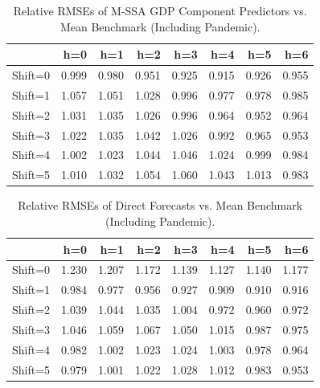 \documentclass[11pt,a4paper]{article}
\begin{document}
\begin{table}[ht]
\caption{Relative RMSEs of M-SSA GDP Component Predictors vs. Mean Benchmark (Including Pandemic).
\label{tab:rRMSE_mSSA_comp_mean2}}
\centering
\begin{tabular}{rrrrrrrr}
  \hline
 & h=0 & h=1 & h=2 & h=3 & h=4 & h=5 & h=6 \\ 
  \hline
Shift=0 & 0.999 & 0.980 & 0.951 & 0.925 & 0.915 & 0.926 & 0.955 \\ 
  Shift=1 & 1.057 & 1.051 & 1.028 & 0.996 & 0.977 & 0.978 & 0.985 \\ 
  Shift=2 & 1.031 & 1.035 & 1.026 & 0.996 & 0.964 & 0.952 & 0.964 \\ 
  Shift=3 & 1.022 & 1.035 & 1.042 & 1.026 & 0.992 & 0.965 & 0.953 \\ 
  Shift=4 & 1.002 & 1.023 & 1.044 & 1.046 & 1.024 & 0.999 & 0.984 \\ 
  Shift=5 & 1.010 & 1.032 & 1.054 & 1.060 & 1.043 & 1.013 & 0.983 \\  
   \hline
\end{tabular}
\end{table}

\begin{table}[htpb]
\caption{Relative RMSEs of Direct Forecasts vs. Mean Benchmark (Including Pandemic).
\label{tab:rRMSE_mSSA_comp_direct3}}
\centering
\begin{tabular}{rrrrrrrr}
  \hline
 & h=0 & h=1 & h=2 & h=3 & h=4 & h=5 & h=6 \\ 
  \hline
Shift=0 & 1.230 & 1.207 & 1.172 & 1.139 & 1.127 & 1.140 & 1.177 \\ 
  Shift=1 & 0.984 & 0.977 & 0.956 & 0.927 & 0.909 & 0.910 & 0.916 \\ 
  Shift=2 & 1.039 & 1.044 & 1.035 & 1.004 & 0.972 & 0.960 & 0.972 \\ 
  Shift=3 & 1.046 & 1.059 & 1.067 & 1.050 & 1.015 & 0.987 & 0.975 \\ 
  Shift=4 & 0.982 & 1.002 & 1.023 & 1.024 & 1.003 & 0.978 & 0.964 \\ 
  Shift=5 & 0.979 & 1.001 & 1.022 & 1.028 & 1.012 & 0.983 & 0.953 \\   
   \hline
\end{tabular}

\end{table}
\end{document}
